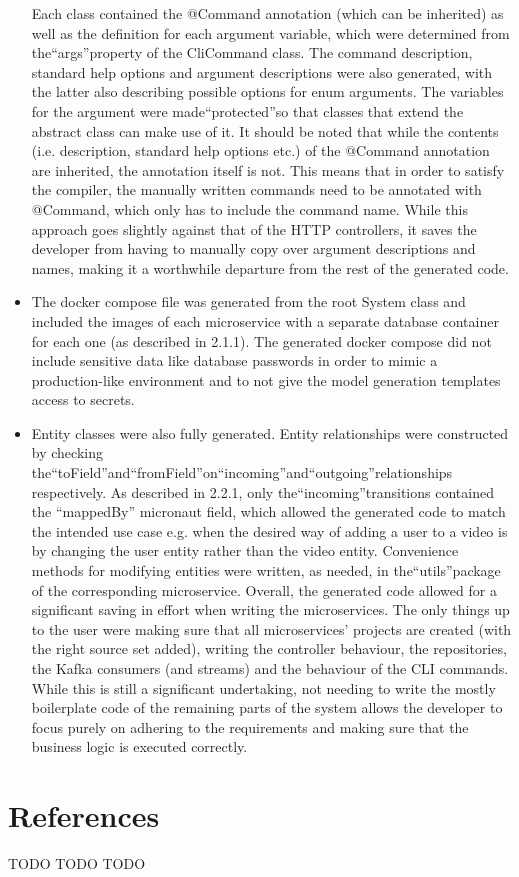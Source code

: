 \documentclass[parskip=full]{article}
\begin{document}
\begin{itemize}
Each class contained the @Command annotation (which can be inherited) as well as the definition for each argument variable, which were determined from the``args''property of the CliCommand class.
The command description, standard help options and argument descriptions were also generated, with the latter also describing possible options for enum arguments.
The variables for the argument were made``protected''so that classes that extend the abstract class can make use of it.
It should be noted that while the contents (i.e. description, standard help options etc.) of the @Command annotation are inherited, the annotation itself is not.
This means that in order to satisfy the compiler, the manually written commands need to be annotated with @Command, which only has to include the command name.
While this approach goes slightly against that of the HTTP controllers, it saves the developer from having to manually copy over argument descriptions and names, making it a worthwhile departure from the rest of the generated code.
\item	The docker compose file was generated from the root System class and included the images of each microservice with a separate database container for each one (as described in 2.1.1).
The generated docker compose did not include sensitive data like database passwords in order to mimic a production-like environment and to not give the model generation templates access to secrets.
\item	Entity classes were also fully generated.
Entity relationships were constructed by checking the``toField''and``fromField''on``incoming''and``outgoing''relationships respectively.
As described in 2.2.1, only the``incoming''transitions contained the ``mappedBy'' micronaut field, which allowed the generated code to match the intended use case e.g. when the desired way of adding a user to a video is by changing the user entity rather than the video entity.
Convenience methods for modifying entities were written, as needed, in the``utils''package of the corresponding microservice.
Overall, the generated code allowed for a significant saving in effort when writing the microservices.
The only things up to the user were making sure that all microservices' projects are created (with the right source set added), writing the controller behaviour, the repositories, the Kafka consumers (and streams) and the behaviour of the CLI commands.
While this is still a significant undertaking, not needing to write the mostly boilerplate code of the remaining parts of the system allows the developer to focus purely on adhering to the requirements and making sure that the business logic is executed correctly.
\end{itemize}
    \pagebreak
    \section{References}
    TODO TODO TODO
\end{document}
